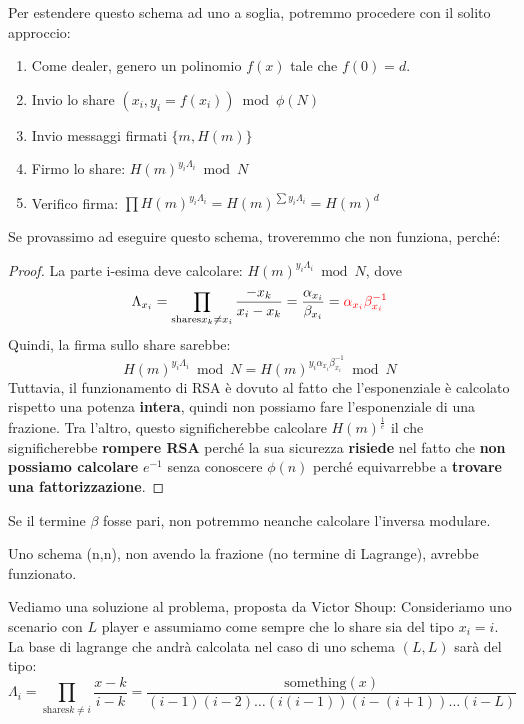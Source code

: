 Per estendere questo schema ad uno a soglia, potremmo procedere con il solito approccio:
\begin{enumerate}
    \item Come dealer, genero un polinomio $f(x)$ tale che $f(0)=d$.
    \item Invio lo share $(x_i,y_i=f(x_i))\bmod\phi(N)$
    \item Invio messaggi firmati $\{m, H(m)\}$
    \item Firmo lo share: $H(m)^{y_i\Lambda_i}\bmod{N}$
    \item Verifico firma: $\prod H(m)^{y_i\Lambda_i}=H(m)^{\sum y_i\Lambda_i}=H(m)^d$
\end{enumerate}
Se provassimo ad eseguire questo schema, troveremmo che non funziona, perché:
\begin{proof}
La parte i-esima deve calcolare: $H(m)^{y_i\Lambda_i}\bmod{N}$, dove 
\[\Lambda_{x_i}=\prod_{\text{shares} x_k\ne x_i}\frac{-x_k}{x_i-x_k}=\frac{\alpha_{x_i}}{\beta_{x_i}}=\textcolor{red}{\alpha_{x_i}\beta_{x_i}^{-1}}\]
Quindi, la firma sullo share sarebbe:
\[H(m)^{y_i\Lambda_i}\bmod{N}=H(m)^{y_i\alpha_{x_i}\beta_{x_i}^{-1}}\bmod{N}\]
Tuttavia, il funzionamento di RSA è dovuto al fatto che l'esponenziale è calcolato rispetto una potenza \textbf{intera}, quindi non possiamo fare l'esponenziale di una frazione. Tra l'altro, questo significherebbe calcolare $H(m)^\frac{1}{e}$ il che significherebbe \textbf{rompere RSA} perché la sua sicurezza \textbf{risiede} nel fatto che \textbf{non possiamo calcolare} $e^{-1}$ senza conoscere $\phi(n)$ perché equivarrebbe a \textbf{trovare una fattorizzazione}.
\end{proof}
\begin{remark}
Se il termine $\beta$ fosse pari, non potremmo neanche calcolare l'inversa modulare.
\end{remark}
\begin{remark}
Uno schema (n,n), non avendo la frazione (no termine di Lagrange), avrebbe funzionato.
\end{remark}
Vediamo una soluzione al problema, proposta da Victor Shoup:
Consideriamo uno scenario con $L$ player e assumiamo come sempre che lo share sia del tipo $x_i=i$. La base di lagrange che andrà calcolata nel caso di uno schema $(L,L)$ sarà del tipo:
\begin{equation}\label{eq:lbasersa}
\Lambda_{i}=\prod_{\text{shares} k\ne i}\frac{x-k}{i-k}=\frac{\text{something}(x)}{(i-1)(i-2)\dots(i(i-1))(i-(i+1))\dots(i-L)}
\end{equation}
